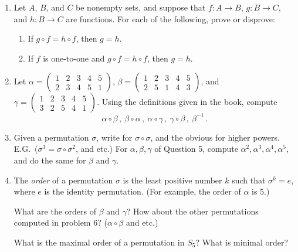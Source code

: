 \documentclass[12pt]{article}
\newcommand{\defcolor}[1]{{\color{blue}{#1}}}
\newcommand{\demph}[1]{{\color{blue}\sl{#1}}}
\begin{document}
\begin{enumerate}
\item Let $A$, $B$, and $C$ be nonempty sets, and suppose that  $f\colon A\to B$, $g\colon B\to C$, and $h\colon B\to C$ are functions.
  For each of the following, prove or disprove:
  
 \begin{enumerate}
  \item  If $g\circ f= h\circ f$, then $g=h$.
  \item  If $f$ is one-to-one and $g\circ f= h\circ f$, then $g=h$.
 \end{enumerate}  


\item Let $\alpha=\begin{pmatrix} 1&2&3&4&5\\
                                  2&3&4&5&1 \end{pmatrix}$,
   $\beta=\begin{pmatrix} 1&2&3&4&5\\
                          2&5&1&4&3 \end{pmatrix}$, and
  $\gamma=\begin{pmatrix} 1&2&3&4&5\\
                          3&2&5&4&1 \end{pmatrix}$.
  Using the definitions given in the book, compute
  \[
  \alpha\circ \beta\,,\
  \beta\circ\alpha\,,\
  \alpha\circ\gamma\,,\
  \gamma\circ\beta\,,\
  \beta^{-1}\,.
  \]



\item Given a permutation $\sigma$, write \defcolor{$\sigma^2$} for $\sigma\circ\sigma$, and the obvious for higher powers.
   E.G.\ ($\sigma^3=\sigma\circ\sigma^2$, and etc.)
  For $\alpha,\beta,\gamma$ of Question 5, compute
  $\alpha^2,\alpha^3,\alpha^4,\alpha^5$, and do the same for $\beta$ and $\gamma$.



\item {\color{Maroon}{\bf Bonus.}}
      The \demph{order} of a permutation $\sigma$ is the least positive number $k$ such that $\sigma^k=e$, where $e$ is the identity
  permutation.
  (For example, the order of $\alpha$ is 5.)

  What are the orders of $\beta$ and $\gamma$?   How about the other permutations  computed in problem 6?
  ($\alpha\circ \beta$ and etc.)

  What is the maximal order of a permutation in $S_5$?  What is minimal order?

\end{enumerate}
\end{document}
